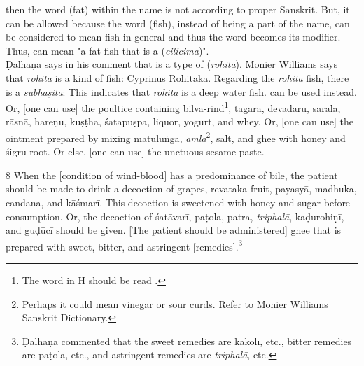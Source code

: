 \begin{translation}
{     then the word  (fat) within the name is not 
    according to proper Sanskrit. But, it can be allowed because the word 
     (fish), instead of being a part of the name, can be considered to 
    mean fish in general and thus the word  becomes its modifier. Thus, 
     can mean "a fat fish that is a  
    (\textit{cilicima})".\\ Ḍalhaṇa says in his comment \citep[425]{vulgate} that 
     is a type of  (\textit{rohita}). Monier Williams says 
    that \textit{rohita} is a kind of fish: Cyprinus Rohitaka. Regarding the 
    \textit{rohita} fish, there is a \textit{subhāṣita}:  This 
    indicates that \textit{rohita} is a deep water fish.} can be used instead. Or, [one can use] the poultice containing 
    \gls{bilva}-rind\footnote{The word  in H should be read 
    .}, \gls{tagara}, \gls{devadāru}, \gls{saralā}, \gls{rāsnā}, 
    \gls{hareṇu}, \gls{kuṣṭha}, \gls{śatapuṣpa}, liquor, yogurt, and whey. Or, [one 
    can use] the ointment prepared by mixing \gls{mātuluṅga}, 
    \emph{amla}\footnote{Perhaps it could mean vinegar or sour curds. Refer to 
    Monier Williams Sanskrit Dictionary.}, salt, and ghee with honey and 
    \gls{śigru}-root. Or else, [one can use] the unctuous sesame paste. 

    \item[8]
    When the [condition of wind-blood] has a predominance of bile, the patient 
    should be made to drink a decoction of grapes, \gls{revataka}-fruit, 
    \gls{payasyā}, \gls{madhuka}, \gls{candana}, and \gls{kāśmarī}. This 
    decoction is sweetened with honey and sugar before consumption. Or, the 
    decoction of \gls{śatāvarī}, \gls{paṭola}, \gls{patra}, \textit{triphalā}, 
    \gls{kaḍurohiṇī}, and \gls{guḍūcī} should be given. [The patient should be 
    administered] ghee that is prepared with sweet, bitter, and astringent 
    [remedies].\footnote{Ḍalhaṇa commented \citep[425]{vulgate} that the sweet 
    remedies are \gls{kākolī}, etc., bitter remedies are \gls{paṭola}, etc., and 
    astringent remedies are \textit{triphalā}, etc.} 
    

\end{translation}
